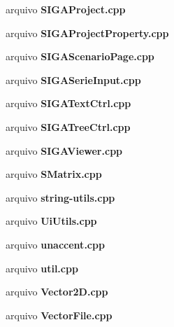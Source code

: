 \begin{DoxyCompactItemize}
\item 
arquivo {\bf S\+I\+G\+A\+Project.\+cpp}
\item 
arquivo {\bf S\+I\+G\+A\+Project\+Property.\+cpp}
\item 
arquivo {\bf S\+I\+G\+A\+Scenario\+Page.\+cpp}
\item 
arquivo {\bf S\+I\+G\+A\+Serie\+Input.\+cpp}
\item 
arquivo {\bf S\+I\+G\+A\+Text\+Ctrl.\+cpp}
\item 
arquivo {\bf S\+I\+G\+A\+Tree\+Ctrl.\+cpp}
\item 
arquivo {\bf S\+I\+G\+A\+Viewer.\+cpp}
\item 
arquivo {\bf S\+Matrix.\+cpp}
\item 
arquivo {\bf string-\/utils.\+cpp}
\item 
arquivo {\bf Ui\+Utils.\+cpp}
\item 
arquivo {\bf unaccent.\+cpp}
\item 
arquivo {\bf util.\+cpp}
\item 
arquivo {\bf Vector2\+D.\+cpp}
\item 
arquivo {\bf Vector\+File.\+cpp}
\end{DoxyCompactItemize}
